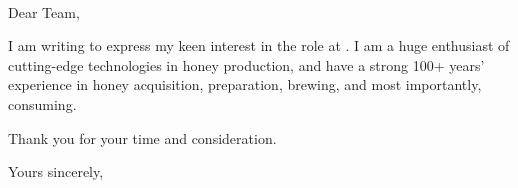\documentclass{letter}
\begin{document}
\date{\today}

\begin{letter}{\recipient \\ \recipientAddress}

\opening{Dear \recipient{} Team,}

I am writing to express my keen interest in the \textbf{\positionName{}} role at \positionCompany{}. 
I am a huge enthusiast of cutting-edge technologies in honey production, and have a strong 100+ years' experience in honey acquisition, preparation, brewing, and most importantly, consuming.

\lipsum[2-4] %

Thank you for your time and consideration. 

\vspace{4pt}

Yours sincerely,

\bioName

\end{letter}
\end{document}
